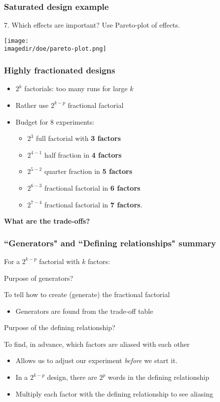 \begin{frame}\frametitle{Saturated design example}

	7. Which effects are important? Use Pareto-plot of effects.
	\begin{center}
		\texttt{[image: \\imagedir/doe/pareto-plot.png]}
	\end{center}
\end{frame}

\begin{frame}\frametitle{Highly fractionated designs}
	\begin{itemize}
		\item	$2^k$ factorials: too many runs for large $k$
		\item	Rather use $2^{k-p}$ fractional factorial
		\item	Budget for 8 experiments:
		\begin{itemize}
			\item	$2^3$ full factorial with \textbf{3 factors}
			\item	$2^{4-1}$ half fraction in \textbf{4 factors}
			\item	$2^{5-2}$ quarter fraction in \textbf{5 factors}
			\item	$2^{6-3}$ fractional factorial in \textbf{6 factors}
			\item	$2^{7-4}$ fractional factorial in \textbf{7 factors}.
		\end{itemize}
	\end{itemize}

	\textbf{What are the trade-offs?}
\end{frame}

\begin{frame}\frametitle{``Generators" and ``Defining relationships" summary}

	For a $2^{k-p}$ factorial with $k$ factors:
	\begin{block}{Purpose of generators?}
		\begin{center}
			To tell how to create (generate) the fractional factorial
		\end{center}
	\end{block}
	\begin{itemize}
		\item	Generators are found from the trade-off table
	\end{itemize}
	\begin{block}{Purpose of the defining relationship?}
		\begin{center}
			To find, in advance, which factors are aliased with each other
		\end{center}
	\end{block}
	\begin{itemize}
		\item	Allows us to adjust our experiment \emph{before} we start it.
		\item	In a $2^{k-p}$ design, there are $2^p$ words in the defining relationship
		\item	Multiply each factor with the defining relationship to see aliasing
	\end{itemize}
\end{frame}

